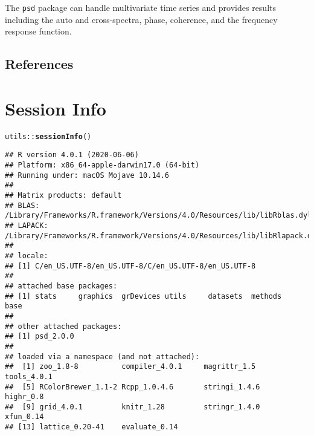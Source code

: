 \documentclass[11pt]{article}\usepackage[]{graphicx}\usepackage[]{color}
\makeatletter
\newcommand{\hlopt}[1]{\textcolor[rgb]{0,0,0}{#1}}%
\newcommand{\hlstd}[1]{\textcolor[rgb]{0.345,0.345,0.345}{#1}}%
\newcommand{\hlkwd}[1]{\textcolor[rgb]{0.737,0.353,0.396}{\textbf{#1}}}%
\newenvironment{kframe}{%
 \def\at@end@of@kframe{}%
 \ifinner\ifhmode%
  \def\at@end@of@kframe{\end{minipage}}%
  \begin{minipage}{\columnwidth}%
 \fi\fi%
 \def\FrameCommand##1{\hskip\@totalleftmargin \hskip-\fboxsep
 \colorbox{shadecolor}{##1}\hskip-\fboxsep
     \hskip-\linewidth \hskip-\@totalleftmargin \hskip\columnwidth}%
 \MakeFramed {\advance\hsize-\width
   \@totalleftmargin\z@ \linewidth\hsize
   \@setminipage}}%
 {\par\unskip\endMakeFramed%
 \at@end@of@kframe}
\newenvironment{knitrout}{}{} %
\newcommand{\Rcmd}[1]{\texttt{#1}}
\makeatother
\begin{document}
The \Rcmd{psd} package can handle multivariate time series and provides results including the auto and cross-spectra, phase, coherence, and the frequency response function.  


\subsection{References}


\section*{Session Info}
\begin{knitrout}
\color{fgcolor}\begin{kframe}
\begin{alltt}
\hlstd{utils}\hlopt{::}\hlkwd{sessionInfo}\hlstd{()}
\end{alltt}
\begin{verbatim}
## R version 4.0.1 (2020-06-06)
## Platform: x86_64-apple-darwin17.0 (64-bit)
## Running under: macOS Mojave 10.14.6
## 
## Matrix products: default
## BLAS:   /Library/Frameworks/R.framework/Versions/4.0/Resources/lib/libRblas.dylib
## LAPACK: /Library/Frameworks/R.framework/Versions/4.0/Resources/lib/libRlapack.dylib
## 
## locale:
## [1] C/en_US.UTF-8/en_US.UTF-8/C/en_US.UTF-8/en_US.UTF-8
## 
## attached base packages:
## [1] stats     graphics  grDevices utils     datasets  methods   base     
## 
## other attached packages:
## [1] psd_2.0.0
## 
## loaded via a namespace (and not attached):
##  [1] zoo_1.8-8          compiler_4.0.1     magrittr_1.5       tools_4.0.1       
##  [5] RColorBrewer_1.1-2 Rcpp_1.0.4.6       stringi_1.4.6      highr_0.8         
##  [9] grid_4.0.1         knitr_1.28         stringr_1.4.0      xfun_0.14         
## [13] lattice_0.20-41    evaluate_0.14
\end{verbatim}
\end{kframe}
\end{knitrout}



\end{document}
